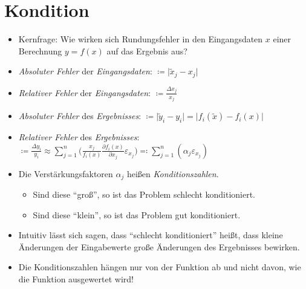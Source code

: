 \documentclass[a4paper, 11pt, accentcolor = tud3b]{tudreport}
\providecommand{\abs}[1]{\ensuremath{{\lvert #1 \rvert}}}
\begin{document}
        \section{Kondition} %
	        \begin{itemize}
	        	\item Kernfrage: Wie wirken sich Rundungsfehler in den Eingangsdaten \( x \) einer Berechnung \( y = f(x) \) auf das Ergebnis aus?
	        	\item \textit{Absoluter Fehler} der \textit{Eingangsdaten}: \tabto{6.5cm} \phantom{XXX} \(\coloneqq \abs{\tilde{x} _ j - x _ j} \)
	        	\item \textit{Relativer Fehler} der \textit{Eingangsdaten}: \tabto{6.5cm} \phantom{XXX} \( \coloneqq \frac{\Delta x _ j}{x _ j} \)
	        	\item \textit{Absoluter Fehler} des \textit{Ergebnisses}: \tabto{6.5cm} \phantom{XXX} \( \coloneqq \abs{\tilde{y} _ i - y _ i} = \abs{f _ i (\tilde{x}) - f _ i (x)} \)
	        	\item \textit{Relativer Fehler} des \textit{Ergebnisses}: \tabto{6.5cm} \phantom{XXX} \( \coloneqq \frac{\Delta y _ i}{y _ i} \approx \sum_{j = 1}^{n} \bigg( \frac{x _ j}{f _ i (x)} \frac{\partial f _ i (x)}{\partial x _ j} \varepsilon _ { x _ j } \bigg) \eqqcolon \sum_{j = 1}^{n} ( \alpha _ j \varepsilon _ { x _ j } ) \)
	        	\item Die Verstärkungsfaktoren \( \alpha _ j \) heißen \textit{Konditionszahlen}.
		        	\begin{itemize}
		        		\item Sind diese \enquote{groß}, so ist das Problem schlecht konditioniert.
		        		\item Sind diese \enquote{klein}, so ist das Problem gut konditioniert.
		        	\end{itemize}
		        \item Intuitiv lässt sich sagen, dass \enquote{schlecht konditioniert} heißt, dass kleine Änderungen der Eingabewerte große Änderungen des Ergebnisses bewirken.
		        \item Die Konditionszahlen hängen nur von der Funktion ab und nicht davon, wie die Funktion ausgewertet wird!
	        \end{itemize}
\end{document}
